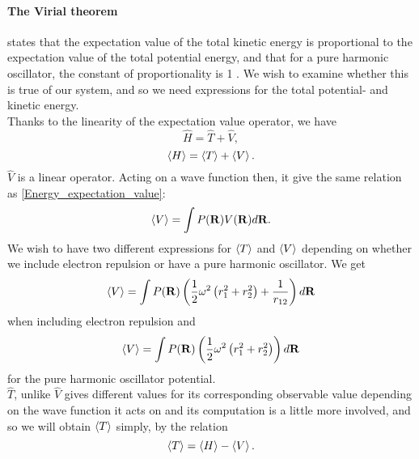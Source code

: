 \documentclass[10pt,a4paper]{article}
\begin{document}
\paragraph{The Virial theorem}states that the expectation value of the total kinetic energy is proportional to the expectation value of the total potential energy, and that for a pure harmonic oscillator, the constant of proportionality is 1 \cite{Problem_set_5}. We wish to examine whether this is true of our system, and so we need expressions for the total potential- and kinetic energy.\\Thanks to the linearity of the expectation value operator, we have 
\begin{equation}
\hat{H}=\hat{T}+\hat{V},
\end{equation}
\begin{equation}
\braket{H} = \braket{T} + \braket{V}.
\end{equation}
$\hat{V}$ is a linear operator. Acting on a wave function then, it give the same relation as \eqref{Energy_expectation_value}:
\begin{equation}
\braket{V} = \int P({\bf R})V({\bf R})d{\bf R}.
\end{equation}
We wish to have two different expressions for $\braket{T}$ and $\braket{V}$ depending on whether we include electron repulsion or have a pure harmonic oscillator. We get
\begin{equation}
\braket{V} = \int P({\bf R})\left( \frac{1}{2} \omega^2   \left( r_1^2+r_2^2 \right) +\frac{1}{r_{12}} \right)d{\bf R}
\end{equation}
when including electron repulsion and 
\begin{equation}
\braket{V} = \int P({\bf R})\left( \frac{1}{2} \omega^2   \left( r_1^2+r_2^2 \right) \right)d{\bf R}
\end{equation}
for the pure harmonic oscillator potential.\\$\hat{T}$, unlike $\hat{V}$ gives different values for its corresponding observable value depending on the wave function it acts on and its computation is a little more involved, and so we will obtain $\braket{T}$ simply, by the relation
\begin{equation}
\braket{T} = \braket{H}-\braket{V}.
\end{equation}
\end{document}
